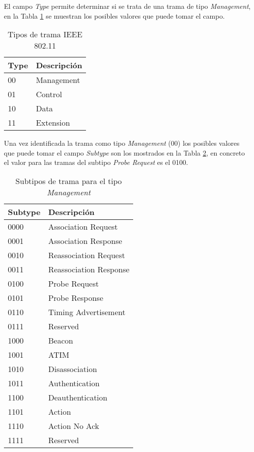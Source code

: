 \documentclass[../proyecto.tex]{subfiles}
\begin{document}
El campo \textit{Type} permite determinar si se trata de una trama de tipo \textit{Management}, en la Tabla \ref{table:tipos_trama} se muestran los posibles valores que puede tomar el campo.\\

\begin{table}[h!]
\centering
\begin{tabular}{ |l|m{20em}| }
\hline
\textbf{Type} & \textbf{Descripción} \\
\hline\hline
00  & Management          \\ \hline
01  & Control  \\ \hline
10  & Data \\ \hline
11 & Extension \\ \hline
\end{tabular}
\caption{Tipos de trama IEEE 802.11}
\label{table:tipos_trama}
\end{table}

Una vez identificada la trama como tipo \textit{Management} (00) los posibles valores que puede tomar el campo \textit{Subtype} son los mostrados en la Tabla \ref{table:subtipos_trama}, en concreto el valor para las tramas del subtipo \textit{Probe Request} es el 0100.

\begin{table}[h!]
\centering
\begin{tabular}{ |l|m{20em}| }
\hline
\textbf{Subtype} & \textbf{Descripción} \\
\hline\hline
0000  & Association Request  \\ \hline
0001  & Association Response \\ \hline
0010  & Reassociation Request \\ \hline
0011  & Reassociation Response \\ \hline
0100  & Probe Request \\ \hline
0101  & Probe Response \\ \hline
0110  & Timing Advertisement \\ \hline
0111  & Reserved \\ \hline
1000  & Beacon \\ \hline
1001  & ATIM \\ \hline
1010  & Disassociation \\ \hline
1011  & Authentication \\ \hline
1100  & Deauthentication \\ \hline
1101  & Action \\ \hline
1110  & Action No Ack \\ \hline
1111  & Reserved \\ \hline
\end{tabular}
\caption{Subtipos de trama para el tipo \textit{Management}}
\label{table:subtipos_trama}
\end{table}
\end{document}
